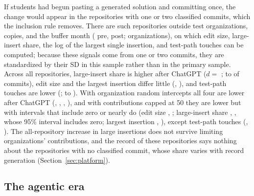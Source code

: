 \documentclass[acmsmall,screen,review,anonymous]{acmart}
\begin{document}
If students had begun pasting a generated solution and committing once, the change would appear in the repositories with one or two classified commits, which the inclusion rule removes. There are  such repositories outside test organizations, copies, and the buffer month ( pre,  post;  organizations), on which edit size, large-insert share, the log of the largest single insertion, and test-path touches can be computed; because these signals come from one or two commits, they are standardized by their SD in this sample rather than in the primary sample. Across all repositories, large-insert share is higher after ChatGPT ($d = $ ;  to  of commits), edit size and the largest insertion differ little (, ), and test-path touches are lower (;  to ). With organization random intercepts all four are lower after ChatGPT (, , , ), and with contributions capped at 50 they are lower but with intervals that include zero or nearly do (edit size , ; large-insert share , , whose 95\% interval  includes zero; largest insertion , ), except test-path touches (, ). The all-repository increase in large insertions does not survive limiting organizations' contributions, and the record of these repositories says nothing about the repositories with no classified commit, whose share varies with record generation (Section~\ref{sec:platform}).

\subsection{The agentic era}
\label{sec:results-agent}
\end{document}
